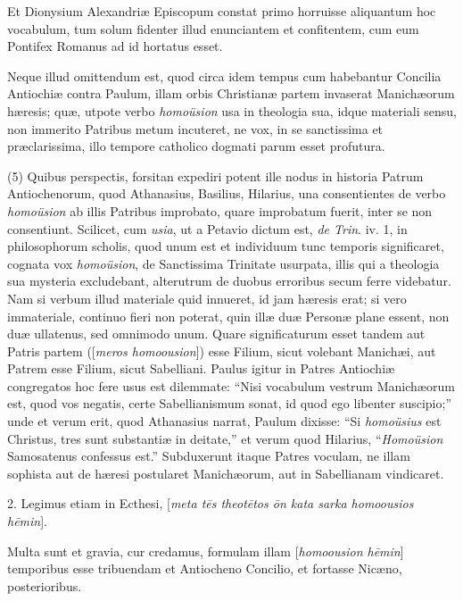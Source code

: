 Et Dionysium Alexandriæ Episcopum constat primo
horruisse aliquantum hoc vocabulum, tum solum fidenter illud
enunciantem et confitentem, cum eum Pontifex Romanus ad id hortatus
esset.

Neque illud omittendum est, quod circa idem
tempus cum habebantur Concilia Antiochiæ contra Paulum, illam orbis
Christianæ partem invaserat Manichæorum hæresis; quæ, utpote verbo
\emph{homoüsion} usa in theologia sua, idque materiali sensu, non
immerito Patribus metum incuteret, ne vox, in se sanctissima et præclarissima,
illo tempore catholico dogmati parum esset profutura.

(5) Quibus perspectis, forsitan expediri potent
ille nodus in historia Patrum Antiochenorum, quod Athanasius, Basilius,
Hilarius, una consentientes de verbo \emph{homoüsion} ab illis
Patribus improbato, quare improbatum fuerit, inter se non consentiunt.
Scilicet, cum \emph{usia}, ut a Petavio dictum est, \emph{de Trin}.
iv. 1, in philosophorum scholis, quod unum est et individuum tunc
temporis significaret, cognata vox \emph{homoüsion}, de Sanctissima
Trinitate usurpata, illis qui a theologia sua mysteria excludebant,
alterutrum de duobus erroribus secum ferre videbatur. Nam si verbum
illud materiale quid innueret, id jam hæresis erat; si vero
immateriale, continuo fieri non poterat, quin illæ duæ Personæ
plane essent, non duæ ullatenus, sed omnimodo unum. Quare
significaturum esset tandem aut Patris partem ([\emph{meros homoousion}])
esse Filium, sicut volebant Manichæi, aut Patrem esse Filium, sicut
Sabelliani. Paulus igitur in Patres Antiochiæ congregatos hoc fere
usus est dilemmate: ``Nisi vocabulum vestrum Manichæorum est, quod vos
negatis, certe Sabellianismum sonat, id quod ego libenter suscipio;''
unde et verum erit, quod Athanasius narrat, Paulum dixisse: ``Si \emph{homoüsius}
est Christus, tres sunt substantiæ in deitate,'' et verum quod
Hilarius, ``\emph{Homoüsion} Samosatenus confessus est.'' Subduxerunt
itaque Patres voculam, ne illam sophista aut de hæresi
postularet Manichæorum, aut in Sabellianam vindicaret.

2. Legimus etiam in Ecthesi, [\emph{meta t\={e}s
theot\={e}tos \={o}n kata sarka homoousios h\={e}min}].

Multa sunt et gravia, cur credamus, formulam
illam [\emph{homoousion h\={e}min}] temporibus esse tribuendam et
Antiocheno Concilio, et fortasse Nicæno, posterioribus.

